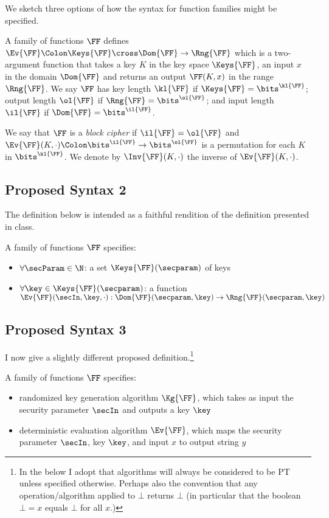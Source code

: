 
We sketch three options of how the syntax for function families might be specified.

A family of functions $\FF$ defines $\Ev{\FF} \Colon \Keys{\FF} \cross \Dom{\FF}\to \Rng{\FF}$ which is a two-argument function that takes a key $K$ in the key space $\Keys{\FF}$, an input $x$ in the domain $\Dom{\FF}$ and returns an output $\FF(K,x)$ in the range $\Rng{\FF}$. We say $\FF$ has key length $\kl{\FF}$ if
$\Keys{\FF}=\bits^{\kl{\FF}}$; output length $\ol{\FF}$ if $\Rng{\FF}=\bits^{\ol{\FF}}$; and input length $\il{\FF}$ if $\Dom{\FF}=\bits^{\il{\FF}}$.

We say that $\FF$ is a \emph{block cipher} if $\il{\FF}=\ol{\FF}$ and $\Ev{\FF}(K,\cdot) \Colon \bits^{\il{\FF}}\to\bits^{\ol{\FF}}$ is a permutation for each $K$ in $\bits^{\kl{\FF}}$. We denote by $\Inv{\FF}(K,\cdot)$ the inverse of $\Ev{\FF}(K,\cdot)$.

\subsection{Proposed Syntax 2}

The definition below is intended as a faithful rendition of the definition presented in class.

\begin{defn}
	A family of functions $\FF$ specifies:
	\begin{itemize}
		\item $\forall \secParam\in\N$: a set $\Keys{\FF}(\secparam)$ of keys
		\item $\forall \key\in\Keys{\FF}(\secparam)$: a function $\Ev{\FF}(\secIn,\key,\cdot):\Dom{\FF}(\secparam,\key)\to\Rng{\FF}(\secparam,\key)$
	\end{itemize}
\end{defn}

\subsection{Proposed Syntax 3}

I now give a slightly different proposed definition.\footnote{In the below I adopt that algorithms will always be considered to be PT unless specified otherwise.
Perhaps also the convention that any operation/algorithm applied to $\bot$ returns $\bot$ (in particular that the boolean $\bot=x$ equals $\bot$ for all $x$.)}

\begin{defn}
	A family of functions $\FF$ specifies:
	\begin{itemize}
		\item randomized key generation algorithm $\Kg{\FF}$, which takes as input the security parameter $\secIn$ and outputs a key $\key$
		\item deterministic evaluation algorithm $\Ev{\FF}$,  which maps the security parameter $\secIn$,  key $\key$, and input $x$ to output string $y$ 
	\end{itemize}
\end{defn}


